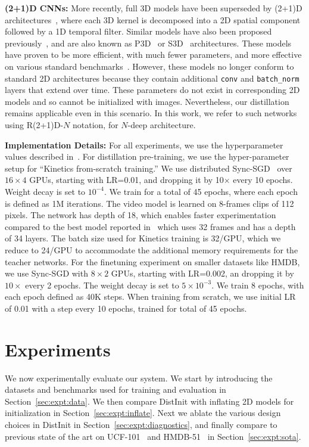 \documentclass[10pt,twocolumn,letterpaper]{article}
\newcommand{\METHOD}[0]{DistInit}
\begin{document}
{\noindent \bf (2+1)D CNNs:} More recently, full 3D models have been superseded by (2+1)D architectures~\cite{tran2018closer},
where each 3D kernel is decomposed into a 2D spatial component followed by a 1D temporal filter. 
Similar models have also been proposed previously~\cite{sun2015human}, and are also known as P3D~\cite{qiu2017learning} or S3D~\cite{xie2017rethinking} architectures.
These models have proven to be more efficient, with much fewer parameters, and more effective on various standard benchmarks~\cite{xie2017rethinking,tran2018closer}.
However, these models no longer conform to standard 2D architectures because they contain additional \texttt{conv} and \texttt{batch\_norm} layers that extend over time. These parameters do not exist in
corresponding 2D models and so cannot be initialized with images. Nevertheless, our distillation remains applicable even in this scenario. In this work, we refer to such networks using R(2+1)D-$N$ notation, for $N$-deep architecture.

{\bf \noindent Implementation Details:}
For all experiments, we use the hyperparameter values described in~\cite{tran2018closer}.
For distillation pre-training, we use the hyper-parameter setup for ``Kinetics from-scratch training.'' We use distributed Sync-SGD~\cite{goyal2017accurate} over $16\times 4$ GPUs, starting
with LR=0.01, and dropping it by 10$\times$ every 10 epochs. Weight decay is set to $10^{-4}$.
We train for a total of 45 epochs, where each epoch is defined as 1M iterations.
The video model is learned on 8-frames clips of 112 pixels. The network has
depth of 18, which enables faster experimentation compared  to the best model reported in~\cite{tran2018closer} which uses 32 frames and has a depth of 34 layers.
The batch size used for Kinetics training is 32/GPU, which we reduce to 24/GPU to accommodate the additional
memory requirements for the teacher networks.
For the finetuning experiment on smaller datasets like HMDB, we use Sync-SGD with $8\times 2$ GPUs, starting
with LR=0.002, an dropping it by $10\times$ every 2 epochs. The weight decay is set to $5\times 10^{-3}$. We train 8 epochs, with each epoch defined as 40K steps. 
When training from scratch, we use initial LR of 0.01 with a step every 10 epochs, trained for total of 45 epochs.
\section{Experiments}\label{sec:expt}

We now experimentally evaluate our system. We start by introducing the datasets and benchmarks used for training and evaluation in Section~\ref{sec:expt:data}. We then compare \METHOD{} with inflating 2D models for initialization in Section~\ref{sec:expt:inflate}. Next we ablate the various design choices in \METHOD{} in Section~\ref{sec:expt:diagnostics}, and finally compare to previous state of the art on UCF-101~\cite{ucf101} and HMDB-51~\cite{hmdb51} in Section~\ref{sec:expt:sota}.
\end{document}
